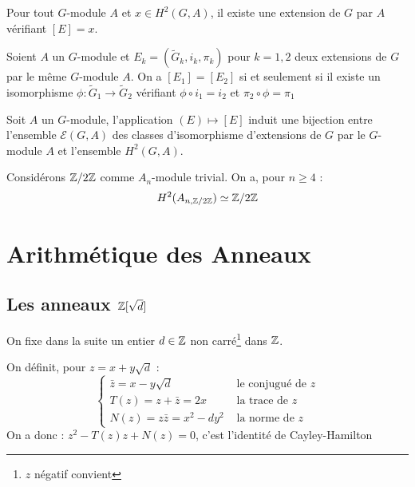 \documentclass{cours}
\begin{document}
\begin{proposition}
    Pour tout $G$-module $A$ et $x \in H^{2}(G, A)$, il existe une extension de $G$ par $A$ vérifiant $\left[E\right] = x$. 
\end{proposition}
\begin{proposition}
    Soient $A$ un $G$-module et $E_{k} = \left(\tilde{G}_{k}, i_{k}, \pi_{k}\right)$ pour $k = 1, 2$ deux extensions de $G$ par le même $G$-module $A$. On a $\left[E_{1}\right] = \left[E_{2}\right]$ si et seulement si il existe un isomorphisme $\phi : \tilde{G}_{1} \rightarrow \tilde{G}_{2}$ vérifiant $\phi \circ i_{1} = i_{2}$ et $\pi_{2} \circ \phi = \pi_{1}$
\end{proposition}
\begin{corollary}
    Soit $A$ un $G$-module, l'application $(E) \mapsto \left[E\right]$ induit une bijection entre l'ensemble $\mathcal{E}(G, A)$ des classes d'isomorphisme d'extensions de $G$ par le $G$-module $A$ et l'ensemble $H^{2}(G, A)$.
\end{corollary}

\begin{theorem}[Schur]
    Considérons $\mathbb{Z}/2\mathbb{Z}$ comme $A_{n}$-module trivial. On a, pour $n \geq 4$ : 
    \[
        H^{2}(A_{n, \mathbb{Z}/2\mathbb{Z}}) \simeq \mathbb{Z}/2\mathbb{Z}
    \]
\end{theorem}

\section{Arithmétique des Anneaux}
\subsection{Les anneaux $\mathbb{Z}[\sqrt{d}]$}
On fixe dans la suite un entier $d \in \mathbb{Z}$ non carré\footnote{$z$ négatif convient} dans $\mathbb{Z}$. 

\begin{definition}
    On définit, pour $z = x + y\sqrt{d}$ :
    \[
        \begin{cases}
            \bar{z} = x - y\sqrt{d} & \text{ le conjugué de } z\\
            T(z) = z + \bar{z} = 2x & \text{ la trace de } z\\
            N(z) = z\bar{z} = x^{2} - dy^{2} & \text{ la norme de } z
        \end{cases}    
    \]
    On a donc : $z^{2} - T(z)z + N(z) = 0$, c'est l'identité de Cayley-Hamilton
\end{definition}
\end{document}
